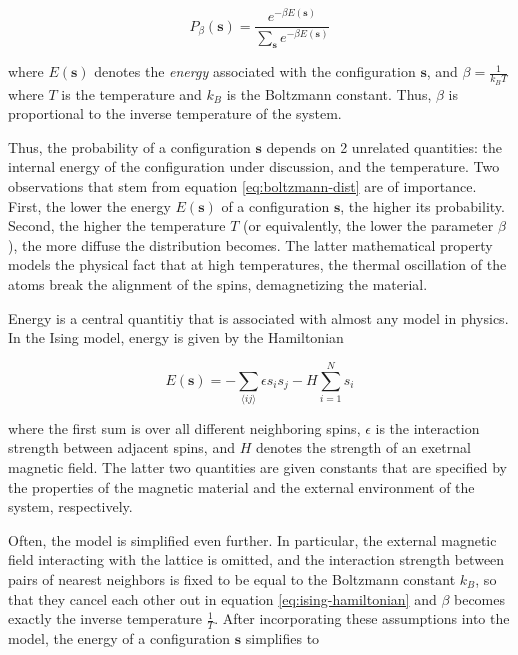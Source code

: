 \documentclass[12pt]{article}
\begin{document}
\begin{equation}
P_\beta(\boldsymbol{s}) = \frac{e^{-\beta E(\boldsymbol{s})}}{\sum_{\boldsymbol{s}} e^{-\beta E(\boldsymbol{s})}}
\label{eq:boltzmann-dist}
\end{equation}

where $E(\boldsymbol{s})$ denotes the \textit{energy} associated with the configuration $\boldsymbol{s}$, and $\beta = \frac{1}{k_B T}$ where $T$ is the temperature and $k_B$ is the Boltzmann constant. Thus, $\beta$ is proportional to the inverse temperature of the system.  

Thus, the probability of a configuration $\boldsymbol{s}$ depends on 2 unrelated quantities: the internal energy of the configuration under discussion, and the temperature. Two observations that stem from equation \ref{eq:boltzmann-dist} are of importance. First, the lower the energy $E(\boldsymbol{s})$ of a configuration $\boldsymbol{s}$, the higher its probability. Second, the higher the temperature $T$ (or equivalently, the lower the parameter $\beta$), the more diffuse the distribution becomes. The latter mathematical property models the physical fact that at high temperatures, the thermal oscillation of the atoms break the alignment of the spins, demagnetizing the material. 

Energy is a central quantitiy that is associated with almost any model in physics. In the Ising model, energy is given by the Hamiltonian

\begin{equation}
E(\boldsymbol{s}) = - \sum_{\langle ij \rangle} \epsilon s_i s_j - H \sum_{i=1}^N s_i
\label{eq:ising-hamiltonian}
\end{equation}

where the first sum is over all different neighboring spins, $\epsilon$ is the interaction strength between adjacent spins, and $H$ denotes the strength of an exetrnal magnetic field. The latter two quantities are given constants that are specified by the properties of the magnetic material and the external environment of the system, respectively.

Often, the model is simplified even further. In particular, the external magnetic field interacting with the lattice is omitted, and the interaction strength between pairs of nearest neighbors is fixed to be equal to the Boltzmann constant $k_B$, so that they cancel each other out in equation \ref{eq:ising-hamiltonian} and $\beta$ becomes exactly the inverse temperature $\frac{1}{T}$. After incorporating these assumptions into the model, the energy of a configuration $\boldsymbol{s}$ simplifies to 
\end{document}

